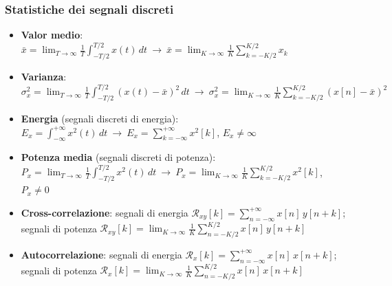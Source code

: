 \documentclass[12pt, a4paper]{article}
\begin{document}
\subsubsection{Statistiche dei segnali discreti}
\begin{itemize}
    \item \textbf{Valor medio}: $\displaystyle\bar x = \lim_{T\to\infty}\frac1T\int_{-T/2}^{T/2}x(t)\,dt \ \to\ \bar x = \lim_{K\to\infty}\frac1K\sum_{k=-K/2}^{K/2} x_k$
    \item \textbf{Varianza}: $\displaystyle\sigma_x^2 = \lim_{T\to\infty}\frac1T\int_{-T/2}^{T/2}(x(t)-\bar x)^2\,dt \ \to\ \sigma_x^2 = \lim_{K\to\infty}\frac1K\sum_{k=-K/2}^{K/2} (x[n]-\bar x)^2$
    \item \textbf{Energia} (segnali discreti di energia): $\displaystyle E_x = \int_{-\infty}^{+\infty}x^2(t)\,dt \ \to\ E_x=\sum_{k=-\infty}^{+\infty}x^2[k]$, $E_x\ne\infty$
    \item \textbf{Potenza media} (segnali discreti di potenza): $\displaystyle P_x = \lim_{T\to\infty}\frac1T\int_{-T/2}^{T/2}x^2(t)\,dt \ \to\ P_x=\lim_{K\to\infty}\frac1K\sum_{k=-K/2}^{K/2}x^2[k]$, $P_x\ne0$
    \item \textbf{Cross-correlazione}: segnali di energia $\displaystyle\mathcal{R}_{xy}[k]=\sum_{n=-\infty}^{+\infty}x[n]\,y[n+k]$; segnali di potenza $\displaystyle\mathcal{R}_{xy}[k]=\lim_{K\to\infty}\frac1K\sum_{n=-K/2}^{K/2}x[n]\,y[n+k]$
    \item \textbf{Autocorrelazione}: segnali di energia $\displaystyle\mathcal{R}_x[k]=\sum_{n=-\infty}^{+\infty}x[n]\,x[n+k]$; segnali di potenza $\displaystyle\mathcal{R}_x[k]=\lim_{K\to\infty}\frac1K\sum_{n=-K/2}^{K/2}x[n]\,x[n+k]$
\end{itemize}
\end{document}
